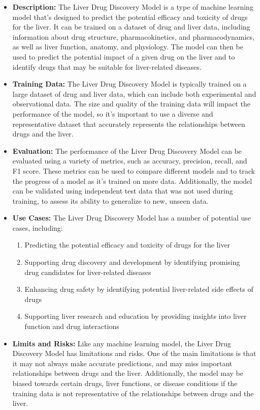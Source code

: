 \begin{itemize}
    \item \textbf{Description:} The Liver Drug Discovery Model is a type of machine learning model that's designed to predict the potential efficacy and toxicity of drugs for the liver. It can be trained on a dataset of drug and liver data, including information about drug structure, pharmacokinetics, and pharmacodynamics, as well as liver function, anatomy, and physiology. The model can then be used to predict the potential impact of a given drug on the liver and to identify drugs that may be suitable for liver-related diseases.
    \item \textbf{Training Data:} The Liver Drug Discovery Model is typically trained on a large dataset of drug and liver data, which can include both experimental and observational data. The size and quality of the training data will impact the performance of the model, so it's important to use a diverse and representative dataset that accurately represents the relationships between drugs and the liver.
    \item \textbf{Evaluation:} The performance of the Liver Drug Discovery Model can be evaluated using a variety of metrics, such as accuracy, precision, recall, and F1 score. These metrics can be used to compare different models and to track the progress of a model as it's trained on more data. Additionally, the model can be validated using independent test data that was not used during training, to assess its ability to generalize to new, unseen data.
    \item \textbf{Use Cases:} The Liver Drug Discovery Model has a number of potential use cases, including:
        \begin{enumerate}  
            \item Predicting the potential efficacy and toxicity of drugs for the liver
            \item Supporting drug discovery and development by identifying promising drug candidates for liver-related diseases
            \item Enhancing drug safety by identifying potential liver-related side effects of drugs
            \item Supporting liver research and education by providing insights into liver function and drug interactions
        \end{enumerate}
    \item \textbf{Limits and Risks:} Like any machine learning model, the Liver Drug Discovery Model has limitations and risks. One of the main limitations is that it may not always make accurate predictions, and may miss important relationships between drugs and the liver. Additionally, the model may be biased towards certain drugs, liver functions, or disease conditions if the training data is not representative of the relationships between drugs and the liver.

\end{itemize}
